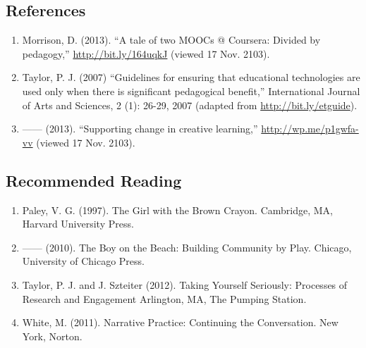 \subsection{References}

\begin{enumerate}
\item
  Morrison, D. (2013). ``A tale of two MOOCs @ Coursera: Divided by
  pedagogy,'' \href{http://bit.ly/164uqkJ}{http://bit.ly/164uqkJ}
  (viewed 17 Nov. 2103).
\item
  Taylor, P. J. (2007) ``Guidelines for ensuring that educational
  technologies are used only when there is significant pedagogical
  benefit,'' International Journal of Arts and Sciences, 2 (1): 26-29,
  2007 (adapted from
  \href{http://bit.ly/etguide}{http://bit.ly/etguide}).
\item
  ------ (2013). ``Supporting change in creative learning,''
  \href{http://wp.me/p1gwfa-vv}{http://wp.me/p1gwfa-vv} (viewed 17 Nov.
  2103).
\end{enumerate}
\subsection{Recommended Reading}

\begin{enumerate}
\item
  Paley, V. G. (1997). The Girl with the Brown Crayon. Cambridge, MA,
  Harvard University Press.
\item
  ------ (2010). The Boy on the Beach: Building Community by Play.
  Chicago, University of Chicago Press.
\item
  Taylor, P. J. and J. Szteiter (2012). Taking Yourself Seriously:
  Processes of Research and Engagement Arlington, MA, The Pumping
  Station.
\item
  White, M. (2011). Narrative Practice: Continuing the Conversation. New
  York, Norton.
\end{enumerate}
